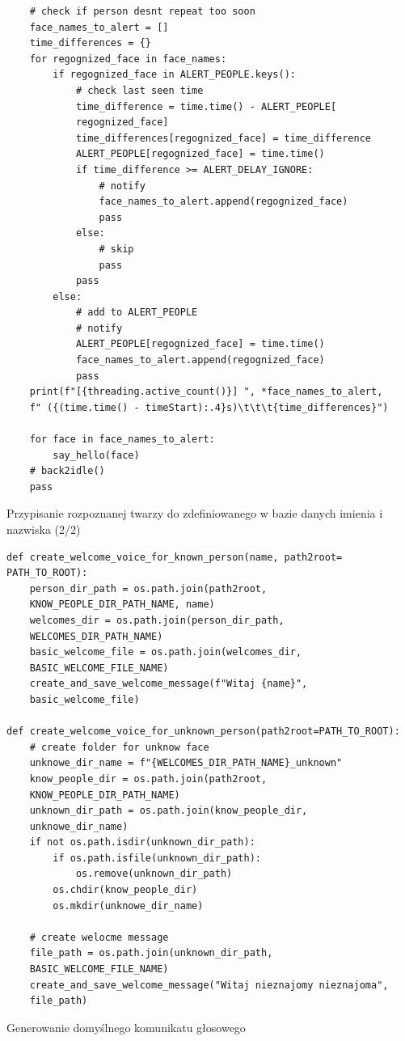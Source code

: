 \documentclass[a4paper,12pt,reqno]{article}
\begin{document}
\begin{listing}[H]%
\begin{mdframed}[backgroundcolor=codebg]
\begin{verbatim}
    # check if person desnt repeat too soon
    face_names_to_alert = []
    time_differences = {}
    for regognized_face in face_names:
        if regognized_face in ALERT_PEOPLE.keys():
            # check last seen time
            time_difference = time.time() - ALERT_PEOPLE[
            regognized_face]
            time_differences[regognized_face] = time_difference
            ALERT_PEOPLE[regognized_face] = time.time()
            if time_difference >= ALERT_DELAY_IGNORE:
                # notify
                face_names_to_alert.append(regognized_face)
                pass
            else:
                # skip
                pass
            pass
        else:
            # add to ALERT_PEOPLE
            # notify
            ALERT_PEOPLE[regognized_face] = time.time()
            face_names_to_alert.append(regognized_face)
            pass
    print(f"[{threading.active_count()}] ", *face_names_to_alert, 
    f" ({(time.time() - timeStart):.4}s)\t\t\t{time_differences}")
    
    for face in face_names_to_alert:
        say_hello(face)
    # back2idle()
    pass
\end{verbatim}
\end{mdframed}
\caption{Przypisanie rozpoznanej twarzy do zdefiniowanego w bazie danych imienia i nazwiska (2/2)}
\label{listing:py_encodeThisFrameFaces_2}
\end{listing}

\begin{listing}[H]%
\begin{mdframed}[backgroundcolor=codebg]
\begin{verbatim}
def create_welcome_voice_for_known_person(name, path2root=
PATH_TO_ROOT):
    person_dir_path = os.path.join(path2root, 
    KNOW_PEOPLE_DIR_PATH_NAME, name)
    welcomes_dir = os.path.join(person_dir_path, 
    WELCOMES_DIR_PATH_NAME)
    basic_welcome_file = os.path.join(welcomes_dir, 
    BASIC_WELCOME_FILE_NAME)
    create_and_save_welcome_message(f"Witaj {name}", 
    basic_welcome_file)

def create_welcome_voice_for_unknown_person(path2root=PATH_TO_ROOT):
    # create folder for unknow face
    unknowe_dir_name = f"{WELCOMES_DIR_PATH_NAME}_unknown"
    know_people_dir = os.path.join(path2root, 
    KNOW_PEOPLE_DIR_PATH_NAME)
    unknown_dir_path = os.path.join(know_people_dir, 
    unknowe_dir_name)
    if not os.path.isdir(unknown_dir_path):
        if os.path.isfile(unknown_dir_path):
            os.remove(unknown_dir_path)
        os.chdir(know_people_dir)
        os.mkdir(unknowe_dir_name)
    
    # create welocme message
    file_path = os.path.join(unknown_dir_path, 
    BASIC_WELCOME_FILE_NAME)
    create_and_save_welcome_message("Witaj nieznajomy nieznajoma", 
    file_path)
\end{verbatim}
\end{mdframed}
\caption{Generowanie domyślnego komunikatu głosowego}
\label{listing:py1}
\end{listing}
\end{document}
